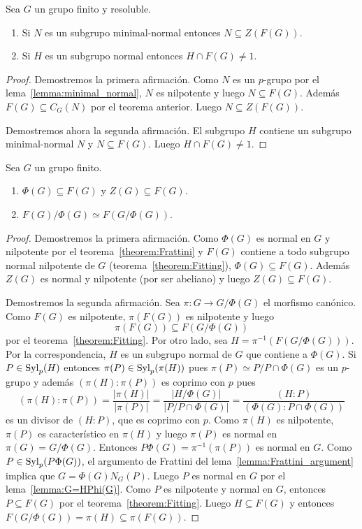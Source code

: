 \begin{corollary}
	Sea $G$ un grupo finito y resoluble. 
	\begin{enumerate}
		\item Si $N$ es un subgrupo minimal-normal entonces $N\subseteq
			Z(F(G))$. 
		\item Si $H$ es un subgrupo normal entonces $H\cap F(G)\ne 1$.
	\end{enumerate}
\end{corollary}

\begin{proof}
	Demostremos la primera afirmación. Como $N$ es un $p$-grupo por el
	lema~\ref{lemma:minimal_normal}, $N$ es nilpotente y luego $N\subseteq
	F(G)$. 	Además $F(G)\subseteq C_G(N)$ por el
	teorema anterior.  Luego $N\subseteq Z(F(G))$. 

	Demostremos ahora la segunda afirmación. El subgrupo $H$ contiene un
	subgrupo minimal-normal $N$ y $N\subseteq F(G)$. Luego $H\cap F(G)\ne1$. 
\end{proof}

\begin{theorem}
	Sea $G$ un grupo finito.
	\begin{enumerate}
		\item $\Phi(G)\subseteq F(G)$ y $Z(G)\subseteq F(G)$.
		\item $F(G)/\Phi(G)\simeq F(G/\Phi(G))$.
	\end{enumerate}
\end{theorem}

\begin{proof}
	Demostremos la primera afirmación. Como $\Phi(G)$ es normal en $G$ y
	nilpotente por el teorema~\ref{theorem:Frattini} y $F(G)$ contiene a todo
	subgrupo normal nilpotente de $G$ (teorema~\ref{theorem:Fitting}),
	$\Phi(G)\subseteq F(G)$. Además $Z(G)$ es normal y nilpotente (por ser
	abeliano) y luego $Z(G)\subseteq F(G)$.

	Demostremos la segunda afirmación. Sea $\pi\colon G\to G/\Phi(G)$ el
	morfismo canónico. Como $F(G)$ es nilpotente, $\pi(F(G))$ es nilpotente y
	luego 
	\[
	\pi(F(G))\subseteq F(G/\Phi(G))
	\]
	por el teorema~\ref{theorem:Fitting}. Por otro lado, sea
	$H=\pi^{-1}(F(G/\Phi(G)))$. Por la correspondencia, $H$ es un subgrupo
	normal de $G$ que contiene a $\Phi(G)$. Si $P\in\mathrm{Syl}_p(H)$ entonces
	$\pi(P)\in\mathrm{Syl}_p(\pi(H))$ pues $\pi(P)\simeq P/P\cap \Phi(G)$ es un
	$p$-grupo y además $(\pi(H):\pi(P))$ es coprimo con $p$ pues 
	\[
	(\pi(H):\pi(P))
	=\frac{|\pi(H)|}{|\pi(P)|}
	=\frac{|H/\Phi(G)|}{|P/P\cap \Phi(G)|}
	=\frac{(H:P)}{(\Phi(G):P\cap\Phi(G))}
	\]
	es un divisor de $(H:P)$, que es coprimo con $p$. Como $\pi(H)$ es
	nilpotente, $\pi(P)$ es característico en $\pi(H)$ y luego $\pi(P)$ es
	normal en $\pi(G)=G/\Phi(G)$. Entonces $P\Phi(G)=\pi^{-1}(\pi(P))$ es
	normal en $G$. Como $P\in\mathrm{Syl}_p(P\Phi(G))$, el argumento de Frattini del
	lema~\ref{lemma:Frattini_argument} implica que $G=\Phi(G)N_G(P)$. Luego $P$
	es normal en $G$ por el lema~\ref{lemma:G=HPhi(G)}. Como $P$ es nilpotente
	y normal en $G$, entonces $P\subseteq F(G)$ por el
	teorema~\ref{theorem:Fitting}. Luego $H\subseteq F(G)$ y entonces
	$F(G/\Phi(G))=\pi(H)\subseteq \pi(F(G))$.
\end{proof}

